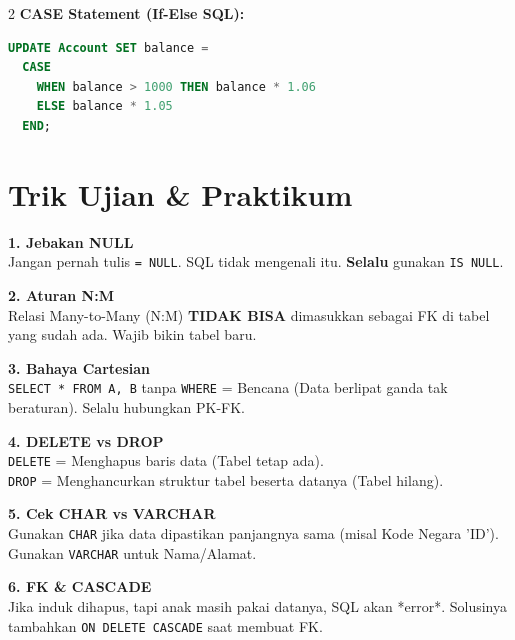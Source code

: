 \documentclass[10pt,a4paper]{article}
\begin{document}
\begin{multicols*}{2}
\textbf{CASE Statement (If-Else SQL):}
\begin{lstlisting}[language=SQL]
UPDATE Account SET balance = 
  CASE 
    WHEN balance > 1000 THEN balance * 1.06
    ELSE balance * 1.05 
  END;
\end{lstlisting}

\section*{Trik Ujian \& Praktikum}

\noindent\textcolor{primary}{\textbf{1. Jebakan NULL}} \\
Jangan pernah tulis \texttt{= NULL}. SQL tidak mengenali itu. \textbf{Selalu} gunakan \texttt{IS NULL}.

\vspace{0.5em}
\noindent\textcolor{primary}{\textbf{2. Aturan N:M}} \\
Relasi Many-to-Many (N:M) \textbf{TIDAK BISA} dimasukkan sebagai FK di tabel yang sudah ada. Wajib bikin tabel baru.

\vspace{0.5em}
\noindent\textcolor{primary}{\textbf{3. Bahaya Cartesian}} \\
\texttt{SELECT * FROM A, B} tanpa \texttt{WHERE} = Bencana (Data berlipat ganda tak beraturan). Selalu hubungkan PK-FK.

\vspace{0.5em}
\noindent\textcolor{primary}{\textbf{4. DELETE vs DROP}} \\
\texttt{DELETE} = Menghapus baris data (Tabel tetap ada). \\
\texttt{DROP} = Menghancurkan struktur tabel beserta datanya (Tabel hilang).

\vspace{0.5em}
\noindent\textcolor{primary}{\textbf{5. Cek CHAR vs VARCHAR}} \\
Gunakan \texttt{CHAR} jika data dipastikan panjangnya sama (misal Kode Negara 'ID'). Gunakan \texttt{VARCHAR} untuk Nama/Alamat.

\vspace{0.5em}
\noindent\textcolor{primary}{\textbf{6. FK \& CASCADE}} \\
Jika induk dihapus, tapi anak masih pakai datanya, SQL akan *error*. Solusinya tambahkan \texttt{ON DELETE CASCADE} saat membuat FK.

\end{multicols*}
\end{document}
